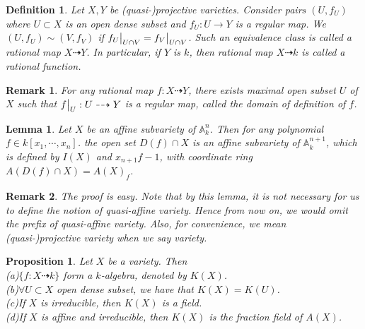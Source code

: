 \documentclass{ctexart}
\newtheorem{definition}{Definition}[section]
\newtheorem{remark}{Remark}[section]
\newtheorem{proposition}{Proposition}[section]
\newtheorem{lemma}{Lemma}[section]
\begin{document}
\begin{definition}
    Let $X, Y$ be (quasi-)projective varieties.
    Consider pairs $(U, f_{U})$ where $U \subset X$ is an open dense subset and $f_{U}: U \rightarrow Y$ is a regular map.
    We $(U, f_{U}) \sim (V, f_{V})$ if $f_{U}\big{|}_{U \cap V} = f_{V}\big{|}_{U \cap V}$.
    Such an equivalence class is called a rational map $X \dashrightarrow Y$.
    In particular, if $Y$ is $k$, then rational map $X \dashrightarrow k$ is called a rational function.
\end{definition}
\begin{remark}
    For any rational map $f: X \dashrightarrow Y$, there exists maximal open subset $U$ of $X$ such that $f\big{|}_{U}: U \dashrightarrow Y$ is a regular map,
    called the domain of definition of $f$.
\end{remark}
\begin{lemma}
    Let $X$ be an affine subvariety of $\mathbb{A}_{k}^{n}$.
    Then for any polynomial $f\in k[x_{1}, \cdots, x_{n}]$. the open set $D(f) \cap X$ is an affine subvariety of $\mathbb{A}_{k}^{n + 1}$,
    which is defined by $I(X)$ and $x_{n + 1}f - 1$, with coordinate ring $A(D(f) \cap X) = A(X)_{f}$.
    \label{Lemma 2.4}
\end{lemma}
\begin{remark}
    The proof is easy.
    Note that by this lemma, it is not necessary for us to define the notion of quasi-affine variety.
    Hence from now on, we would omit the prefix of quasi-affine variety.
    Also, for convenience, we mean (quasi-)projective variety when we say variety.
\end{remark}
\begin{proposition}
    Let $X$ be a variety.
    Then \\
    (a)$\{f: X \dashrightarrow k\}$ form a $k$-algebra, denoted by $K(X)$. \\
    (b)$\forall U \subset X$ open dense subset, we have that $K(X) = K(U)$. \\
    (c)If $X$ is irreducible, then $K(X)$ is a field. \\
    (d)If $X$ is affine and irreducible, then $K(X)$ is the fraction field of $A(X)$.
    \label{Proposition 2.2}
\end{proposition}
\end{document}
